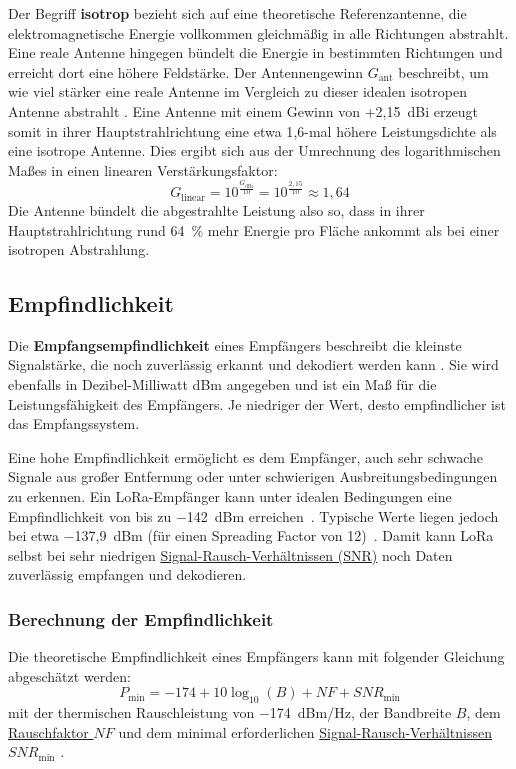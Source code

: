 	
	Der Begriff \textbf{isotrop} bezieht sich auf eine theoretische Referenzantenne, die elektromagnetische Energie vollkommen gleichmä{\ss}ig in alle Richtungen abstrahlt. Eine reale Antenne hingegen bündelt die Energie in bestimmten Richtungen und erreicht dort eine höhere Feldstärke. Der Antennengewinn \(G_\text{ant}\) beschreibt, um wie viel stärker eine reale Antenne im Vergleich zu dieser idealen isotropen Antenne abstrahlt \cite[293]{Kark:2022}. Eine Antenne mit einem Gewinn von +2{,}15~dBi erzeugt somit in ihrer Hauptstrahlrichtung eine etwa 1{,}6-mal höhere Leistungsdichte als eine isotrope Antenne. Dies ergibt sich aus der Umrechnung des logarithmischen Ma{\ss}es in einen linearen Verstärkungsfaktor:
	\[
	G_\text{linear} = 10^{\frac{G_\text{dBi}}{10}} = 10^{\frac{2{,}15}{10}} \approx 1{,}64
	\]
	Die Antenne bündelt die abgestrahlte Leistung also so, dass in ihrer Hauptstrahlrichtung rund 64~\% mehr Energie pro Fläche ankommt als bei einer isotropen Abstrahlung.
	
	\subsection{Empfindlichkeit \label{lora:sensitivity}}
	Die \textbf{Empfangsempfindlichkeit} eines Empfängers beschreibt die kleinste Signalstärke, die noch zuverlässig erkannt und dekodiert werden kann \cite{Asgharzadeh:2018}. Sie wird ebenfalls in Dezibel-Milliwatt dBm angegeben und ist ein Ma{\ss} für die Leistungsfähigkeit des Empfängers. Je niedriger der Wert, desto empfindlicher ist das Empfangssystem.
	
	Eine hohe Empfindlichkeit ermöglicht es dem Empfänger, auch sehr schwache Signale aus gro{\ss}er Entfernung oder unter schwierigen Ausbreitungsbedingungen zu erkennen. Ein LoRa-Empfänger kann unter idealen Bedingungen eine Empfindlichkeit von bis zu −142~dBm erreichen~\cite{Xu:2022b}. Typische Werte liegen jedoch bei etwa −137{,}9~dBm  (für einen Spreading Factor von 12)~\cite[Tabelle~10]{ETSI:2018}. Damit kann LoRa selbst bei sehr niedrigen \hyperref[lora:snr]{Signal-Rausch-Verhältnissen (SNR)} noch Daten zuverlässig empfangen und dekodieren.
	
	\subsubsection{Berechnung der Empfindlichkeit}
	
	Die theoretische Empfindlichkeit eines Empfängers kann mit folgender Gleichung abgeschätzt werden:
	\[
	P_\text{min} = -174 + 10\log_{10}(B) + NF + SNR_\text{min}
	\]
	mit der thermischen Rauschleistung von −174~dBm/Hz, der Bandbreite \(B\), dem \hyperref[lora:noiseFigure]{Rauschfaktor \(NF\)} und dem minimal erforderlichen \hyperref[lora:tab:snrmin]{Signal-Rausch-Verhältnissen \(SNR_\text{min}\)} \cite{ETSI:2018}.
	

